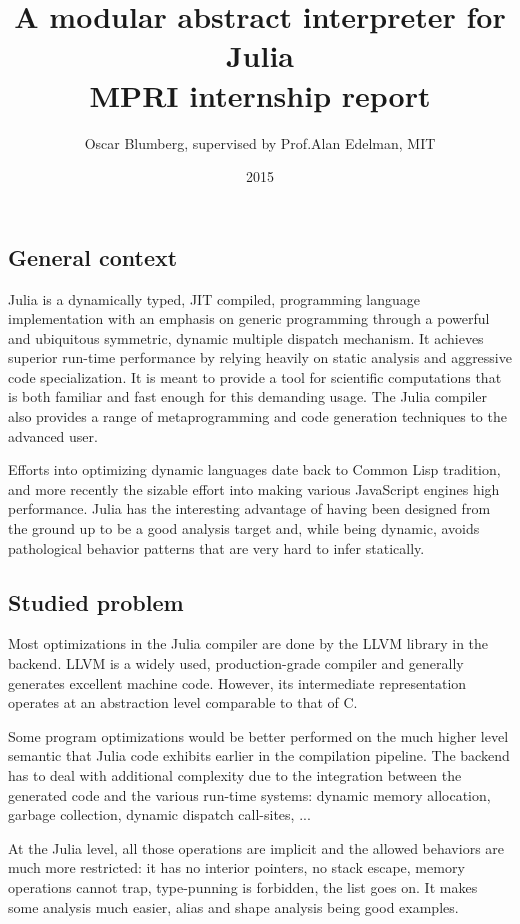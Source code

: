 \documentclass[11pt]{article}
\title{\vspace{-6ex}A modular abstract interpreter for Julia \\ MPRI internship report}
\author{Oscar Blumberg, supervised by Prof.\@ Alan Edelman, MIT}
\date{2015}
\begin{document}
\onehalfspacing
\maketitle

\thispagestyle{empty}
\vspace{1.5ex}
\subsection*{General context}

Julia\cite{julia-paper,julia-web} is a dynamically typed, JIT compiled, programming language implementation with an emphasis on generic programming through a powerful and ubiquitous symmetric, dynamic multiple dispatch mechanism. It achieves superior run-time performance by relying heavily on static analysis and aggressive code specialization. It is meant to provide a tool for scientific computations that is both familiar and fast enough for this demanding usage. The Julia compiler also provides a range of metaprogramming and code generation techniques to the advanced user.

Efforts into optimizing dynamic languages date back to Common Lisp tradition\cite{cl}, and more recently the sizable effort into making various JavaScript engines high performance\cite{js-trace}. Julia has the interesting advantage of having been designed from the ground up to be a good analysis target and, while being dynamic, avoids pathological behavior patterns that are very hard to infer statically.

\subsection*{Studied problem}

Most optimizations in the Julia compiler are done by the LLVM\cite{llvm} library in the backend. LLVM is a widely used, production-grade compiler and generally generates excellent machine code. However, its intermediate representation operates at an abstraction level comparable to that of C.

Some program optimizations would be better performed on the much higher level semantic that Julia code exhibits earlier in the compilation pipeline. The backend has to deal with additional complexity due to the integration between the generated code and the various run-time systems: dynamic memory allocation, garbage collection, dynamic dispatch call-sites, ...

At the Julia level, all those operations are implicit and the allowed behaviors are much more restricted: it has no interior pointers, no stack escape, memory operations cannot trap, type-punning is forbidden, the list goes on. It makes some analysis much easier, alias and shape analysis being good examples. 
\end{document}
